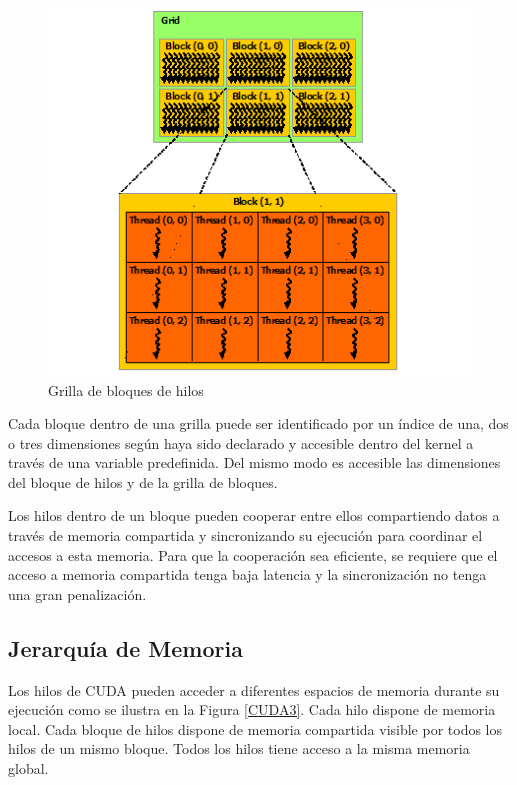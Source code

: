 \documentclass[a4paper,openright,12pt, oneside]{book}
\begin{document}
\begin{figure}[!htbp]
  \begin{center}
    \leavevmode

    \includegraphics[]{grid-of-thread-blocks.png}

    \caption{Grilla de bloques de hilos}
    \label{CUDA2}
  \end{center}
\end{figure}

Cada bloque dentro de una grilla puede ser identificado por un \'indice de una,
dos o tres dimensiones seg\'un haya sido declarado y accesible dentro del kernel
a trav\'es de una variable predefinida. Del mismo modo es accesible las dimensiones
del bloque de hilos y de la grilla de bloques. 

Los hilos dentro de un bloque pueden cooperar entre ellos compartiendo datos
a trav\'es de memoria compartida y sincronizando su ejecuci\'on para coordinar el accesos
a esta memoria. Para que la cooperaci\'on sea eficiente, se requiere que el acceso a memoria
compartida tenga baja latencia y la sincronizaci\'on no tenga una gran penalizaci\'on.

\subsection*{Jerarqu\'ia de Memoria}

Los hilos de CUDA pueden acceder a diferentes espacios de memoria durante su ejecuci\'on como
se ilustra en la Figura \ref{CUDA3}. Cada hilo dispone de memoria local. Cada bloque de hilos
dispone de memoria compartida visible por todos los hilos de un mismo bloque. Todos
los hilos tiene acceso a la misma memoria global.
\end{document}
